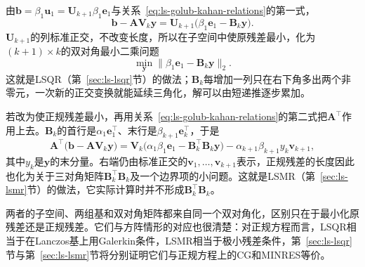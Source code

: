 由$\bm b=\beta_1\bm u_1=\bm U_{k+1}\beta_1\bm e_1$与关系~\eqref{eq:ls-golub-kahan-relations}的第一式，
\begin{equation}
 \bm b-\bm A\bm V_k\bm y=\bm U_{k+1}\bigl(\beta_1\bm e_1-\bm B_k\bm y\bigr).
 \label{eq:ls-golub-kahan-residual-coordinates}
\end{equation}
$\bm U_{k+1}$的列标准正交，不改变长度，所以在子空间中使原残差最小，化为$(k+1)\times k$的双对角最小二乘问题
\begin{equation}
 \min_{\bm y}\lVert\beta_1\bm e_1-\bm B_k\bm y\rVert_2 .
 \label{eq:ls-golub-kahan-lsqr-problem}
\end{equation}
这就是LSQR（第~\ref{sec:ls-lsqr}节）的做法；$\bm B_k$每增加一列只在右下角多出两个非零元，一次新的正交变换就能延续三角化，解可以由短递推逐步累加。

若改为使正规残差最小，再用关系~\eqref{eq:ls-golub-kahan-relations}的第二式把$\bm A^\top$作用上去。$\bm B_k$的首行是$\alpha_1\bm e_1^\top$、末行是$\beta_{k+1}\bm e_k^\top$，于是
\begin{equation}
 \bm A^\top\bigl(\bm b-\bm A\bm V_k\bm y\bigr)
 =\bm V_k\bigl(\alpha_1\beta_1\bm e_1-\bm B_k^\top\bm B_k\bm y\bigr)-\alpha_{k+1}\beta_{k+1}y_k\bm v_{k+1},
 \label{eq:ls-golub-kahan-normal-residual-coordinates}
\end{equation}
其中$y_k$是$\bm y$的末分量。右端仍由标准正交的$\bm v_1,\ldots,\bm v_{k+1}$表示，正规残差的长度因此也化为关于三对角矩阵$\bm B_k^\top\bm B_k$及一个边界项的小问题。这就是LSMR（第~\ref{sec:ls-lsmr}节）的做法，它实际计算时并不形成$\bm B_k^\top\bm B_k$。

两者的子空间、两组基和双对角矩阵都来自同一个双对角化，区别只在于最小化原残差还是正规残差。它们与方阵情形的对应也很清楚：对正规方程而言，LSQR相当于在Lanczos基上用Galerkin条件，LSMR相当于极小残差条件，第~\ref{sec:ls-lsqr}节与第~\ref{sec:ls-lsmr}节将分别证明它们与正规方程上的CG和MINRES等价。
